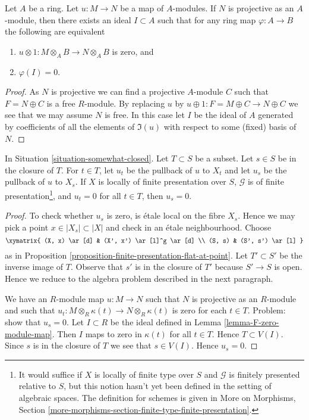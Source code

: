 \begin{lemma}
\label{lemma-F-zero-module-map}
Let $A$ be a ring. Let $u : M \to N$ be a map of $A$-modules.
If $N$ is projective as an $A$-module, then there exists an ideal
$I \subset A$ such that for any ring map $\varphi : A \to B$
the following are equivalent
\begin{enumerate}
\item $u \otimes 1 : M \otimes_A B \to N \otimes_A B$ is zero, and
\item $\varphi(I) = 0$.
\end{enumerate}
\end{lemma}

\begin{proof}
As $N$ is projective we can find a projective $A$-module $C$
such that $F = N \oplus C$ is a free $R$-module.
By replacing $u$ by $u \oplus 1 : F = M \oplus C \to N \oplus C$
we see that we may assume $N$ is free. In this case let $I$ be
the ideal of $A$ generated by coefficients of all the elements of
$\Im(u)$ with respect to some (fixed) basis of $N$.
\end{proof}

\begin{lemma}
\label{lemma-F-zero-somewhat-closed-points}
In Situation \ref{situation-somewhat-closed}.
Let $T \subset S$ be a subset. Let $s \in S$ be in the closure of $T$.
For $t \in T$, let $u_t$ be the pullback of $u$ to $X_t$
and let $u_s$ be the pullback of $u$ to $X_s$.
If $X$ is locally of finite presentation over $S$,
$\mathcal{G}$ is of finite presentation\footnote{It would
suffice if $X$ is locally of finite type over $S$
and $\mathcal{G}$ is finitely presented relative to $S$,
but this notion hasn't yet been defined in the setting
of algebraic spaces. The definition for schemes is
given in More on Morphisms, Section
\ref{more-morphisms-section-finite-type-finite-presentation}.}, and
$u_t = 0$ for all $t \in T$, then $u_s = 0$.
\end{lemma}

\begin{proof}
To check whether $u_s$ is zero, is \'etale local on the fibre $X_s$.
Hence we may pick a point $x \in |X_s| \subset |X|$ and check
in an \'etale neighbourhood. Choose
$$
\xymatrix{
(X, x) \ar[d] & (X', x') \ar[l]^g \ar[d] \\
(S, s) & (S', s') \ar[l]
}
$$
as in Proposition \ref{proposition-finite-presentation-flat-at-point}.
Let $T' \subset S'$ be the inverse image of $T$. Observe that
$s'$ is in the closure of $T'$ because $S' \to S$ is open.
Hence we reduce to the algebra problem described in the
next paragraph.

\medskip\noindent
We have an $R$-module map $u : M \to N$ such that $N$ is projective
as an $R$-module and such that
$u_t : M \otimes_R \kappa(t) \to N \otimes_R \kappa(t)$
is zero for each $t \in T$. Problem: show that $u_s = 0$.
Let $I \subset R$ be the ideal defined in Lemma \ref{lemma-F-zero-module-map}.
Then $I$ maps to zero in $\kappa(t)$ for all $t \in T$.
Hence $T \subset V(I)$. Since $s$ is in the closure of $T$
we see that $s \in V(I)$. Hence $u_s = 0$.
\end{proof}

